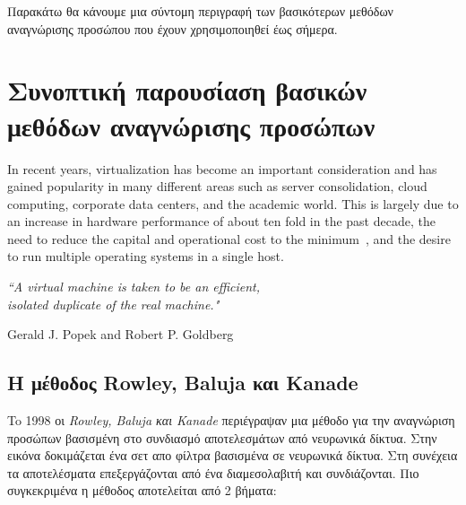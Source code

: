 Παρακάτω θα κάνουμε μια σύντομη περιγραφή των βασικότερων μεθόδων αναγνώρισης
προσώπου που έχουν χρησιμοποιηθεί έως σήμερα.

\section{Συνοπτική παρουσίαση βασικών μεθόδων αναγνώρισης προσώπων}\label{sec:facedetmethods}

In recent years, virtualization has become an important consideration and has
gained popularity in many different areas such as server consolidation, cloud
computing, corporate data centers, and the academic world. This is largely due
to an increase in hardware performance of about ten fold in the past decade, the
need to reduce the capital and operational cost to the minimum~\cite{Graziano},
and the desire to run multiple operating systems in a single host.

\begin{flushright}
  \emph{``A virtual machine is taken to be an efficient,\\
        isolated duplicate of the real
        machine."}~\cite{DBLP:journals/cacm/PopekG74}


  Gerald J. Popek and Robert P. Goldberg
\end{flushright}


\subsection{Η μέθοδος Rowley, Baluja και Kanade~\cite{Rowley:1998:NNF:275341.275344}}

To 1998 οι \emph{Rowley, Baluja και Kanade} περιέγραψαν μια μέθοδο για την αναγνώριση
προσώπων βασισμένη στο συνδιασμό αποτελεσμάτων από νευρωνικά δίκτυα. Στην εικόνα
δοκιμάζεται ένα σετ απο φίλτρα βασισμένα σε νευρωνικά δίκτυα. Στη συνέχεια τα
αποτελέσματα επεξεργάζονται από ένα διαμεσολαβιτή και συνδιάζονται. Πιο συγκεκριμένα
η μέθοδος αποτελείται από 2 βήματα:

